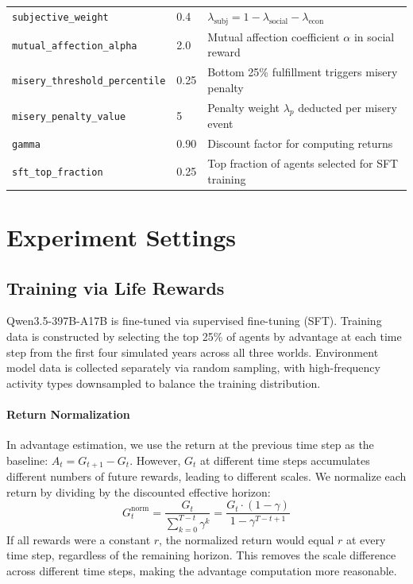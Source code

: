 \begin{table}[htbp]
{\begin{tabular}{p{4.2cm} p{1.8cm} p{7.2cm}}
\texttt{subjective\_weight} & 0.4 & $\lambda_{\text{subj}} = 1 - \lambda_{\text{social}} - \lambda_{\text{econ}}$ \\
\texttt{mutual\_affection\_alpha} & 2.0 & Mutual affection coefficient $\alpha$ in social reward \\
\texttt{misery\_threshold\_percentile} & 0.25 & Bottom 25\% fulfillment triggers misery penalty \\
\texttt{misery\_penalty\_value} & 5 & Penalty weight $\lambda_p$ deducted per misery event \\
\texttt{gamma} & 0.90 & Discount factor for computing returns \\
\texttt{sft\_top\_fraction} & 0.25 & Top fraction of agents selected for SFT training \\
\bottomrule
\end{tabular}}
\end{table}


\section{Experiment Settings}

\subsection{Training via Life Rewards}
\label{sec:appendix_sft}

Qwen3.5-397B-A17B is fine-tuned via supervised fine-tuning (SFT).
Training data is constructed by selecting the top 25\% of agents by advantage at each time step
from the first four simulated years across all three worlds.
Environment model data is collected separately via random sampling, with high-frequency activity types downsampled to balance the training distribution.

\paragraph{Return Normalization}
In advantage estimation, we use the return at the previous time step as the baseline:
$A_t = G_{t+1} - G_t$.
However, $G_t$ at different time steps accumulates different numbers of future rewards, leading to different scales.
We normalize each return by dividing by the discounted effective horizon:
\begin{equation}
G_t^{\text{norm}} = \frac{G_t}{\sum_{k=0}^{T-t} \gamma^k} = \frac{G_t \cdot (1 - \gamma)}{1 - \gamma^{T-t+1}}
\end{equation}
If all rewards were a constant $r$, the normalized return would equal $r$ at every time step,
regardless of the remaining horizon.
This removes the scale difference across different time steps, making the advantage computation more reasonable.

